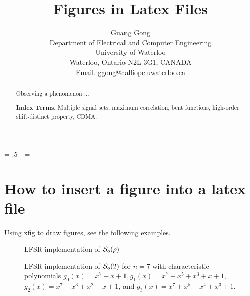 \documentclass{article}
\newcommand{\ls}[1]
    {\dimen0=\fontdimen6\the\font\lineskip=#1\dimen0
     \advance\lineskip.5\fontdimen5\the\font
     \advance\lineskip-\dimen0
     \lineskiplimit=0.9\lineskip
     \baselineskip=\lineskip
     \advance\baselineskip\dimen0
     \normallineskip\lineskip\normallineskiplimit\lineskiplimit
     \normalbaselineskip\baselineskip
     \ignorespaces}
\begin{document}


\title{Figures in Latex Files }
\author{Guang Gong\\
Department of Electrical and Computer Engineering \\
University of Waterloo \\
Waterloo, Ontario N2L 3G1, CANADA \\
Email. ggong@calliope.uwaterloo.ca\\
}

\date{}
 \maketitle

\thispagestyle{plain}
\setcounter{page}{1}

\begin{abstract}
Observing a  phenomenon  ... 


{\bf Index Terms.}  Multiple signal sets, maximum correlation, bent functions, 
high-order shift-distinct property, CDMA.

\end{abstract}

\ls{1.5}
\section{How to insert a figure into a latex file}

Using xfig to draw figures,   see the following examples.


\begin{figure}[t]

\centering
\caption{LFSR implementation of ${\cal S}_o (\rho)$}
\label{fig:fig1}
\end{figure}

\begin{figure}[t]

\centering
\caption{LFSR implementation of ${\cal S}_o (2)$ for $n =7$ with characteristic polynomials
$g_0(x) = x^7+x+1, g_1(x) = x^7+x^5+x^3+x+1$, $g_2(x) = x^7+x^3+x^2+x+1$, and $g_3(x) = x^7+x^5+x^4+x^3+1$.}
\label{fig:fig2}
\end{figure}


 
\end{document}
